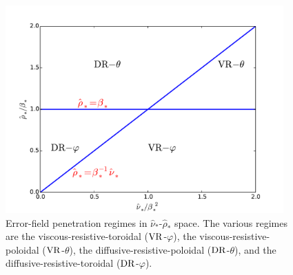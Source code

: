 \documentclass[12pt,prb,aps]{revtex4-1}
\begin{document}
\begin{figure}
\centerline{\includegraphics[width=0.95\textwidth]{Figure4.pdf}}
\caption{Error-field penetration regimes in $\hat{\nu}_\ast$-$\hat{\rho}_\ast$ space. The various regimes are the
viscous-resistive-toroidal (${\rm VR}$-$\varphi$), the viscous-resistive-poloidal (${\rm VR}$-$\theta$), the diffusive-resistive-poloidal (${\rm DR}$-$\theta$), and the  diffusive-resistive-toroidal (${\rm DR}$-$\varphi$). }\label{f6}
\end{figure}
\end{document}
